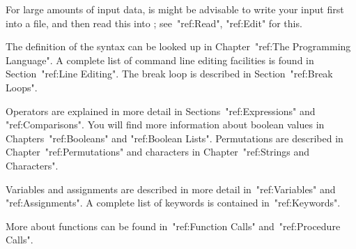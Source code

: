 \null

For large amounts of input data, is might be advisable to write your
input first into a file, and then read this into {\GAP};
see~"ref:Read", "ref:Edit" for this.

The definition of the {\GAP} syntax can be looked up in
Chapter~"ref:The Programming Language".
A complete list of command line editing facilities is found
in Section~"ref:Line Editing".
The break loop is described in Section~"ref:Break Loops".

Operators are explained in more detail in Sections~"ref:Expressions" and
"ref:Comparisons".
You will find more information about boolean values in
Chapters~"ref:Booleans" and "ref:Boolean Lists".
Permutations are described in Chapter~"ref:Permutations" and characters
in Chapter~"ref:Strings and Characters".

Variables and assignments are described in more detail in~"ref:Variables"
and "ref:Assignments".
A complete list of keywords is contained in~"ref:Keywords".

More about functions can be found in~"ref:Function Calls"
and~"ref:Procedure Calls".



